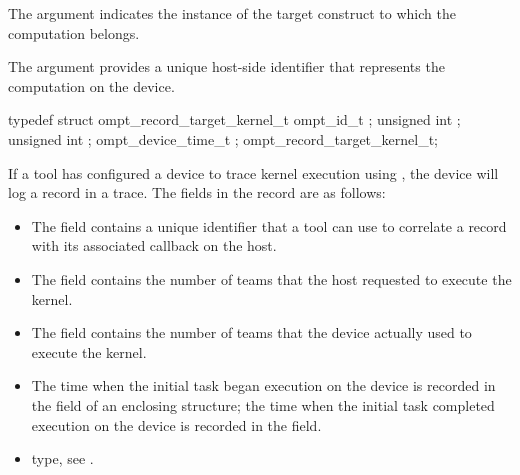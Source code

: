 \constraints

The argument  indicates the instance of the
target construct to which the computation belongs.

The argument  provides a unique host-side
identifier that represents the computation on the device.

\record

\begin{ccppspecific}
\begin{omptRecord}
typedef struct ompt_record_target_kernel_t {
  ompt_id_t ;
  unsigned int ;
  unsigned int ;
  ompt_device_time_t ;
} ompt_record_target_kernel_t;
\end{omptRecord}
\end{ccppspecific}



If a tool has configured a device to trace kernel execution using ,
the device will log a  record in a trace. The fields in the record
are as follows:

\begin{itemize}
\item The  field contains a unique identifier that a tool can use to correlate a
 record with its associated  callback
on the host.

\item The  field contains the number of teams that the host requested to execute the kernel.

\item The  field contains the number of teams that the device actually used to execute the kernel.

\item The time when the initial task began execution on the device is recorded in the  field of an enclosing
 structure; the time when the initial task completed execution on the device is recorded in the  field.
\end{itemize}

\crossreferences
\begin{itemize}
\item {} type, see
.
\end{itemize}


